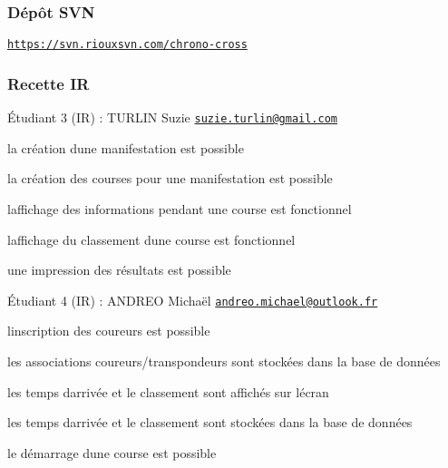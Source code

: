 \subsubsection*{Dépôt S\+VN}

\href{https://svn.riouxsvn.com/chrono-cross}{\tt https\+://svn.\+riouxsvn.\+com/chrono-\/cross}

\subsubsection*{Recette IR}


\begin{DoxyItemize}
\item Étudiant 3 (IR) \+: T\+U\+R\+L\+IN Suzie \href{mailto:suzie.turlin@gmail.com}{\tt suzie.\+turlin@gmail.\+com}~\newline

\begin{DoxyItemize}
\item la création d\textquotesingle{}une manifestation est possible
\item la création des courses pour une manifestation est possible
\item l\textquotesingle{}affichage des informations pendant une course est fonctionnel
\item l\textquotesingle{}affichage du classement d\textquotesingle{}une course est fonctionnel
\item une impression des résultats est possible
\end{DoxyItemize}
\item Étudiant 4 (IR) \+: A\+N\+D\+R\+EO Michaël \href{mailto:andreo.michael@outlook.fr}{\tt andreo.\+michael@outlook.\+fr}~\newline

\begin{DoxyItemize}
\item l\textquotesingle{}inscription des coureurs est possible
\item les associations coureurs/transpondeurs sont stockées dans la base de données
\item les temps d\textquotesingle{}arrivée et le classement sont affichés sur l\textquotesingle{}écran
\item les temps d\textquotesingle{}arrivée et le classement sont stockées dans la base de données
\item le démarrage d\textquotesingle{}une course est possible
\end{DoxyItemize}
\end{DoxyItemize}

